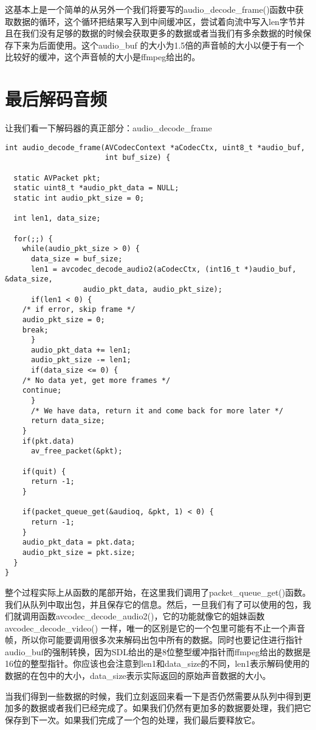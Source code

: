 这基本上是一个简单的从另外一个我们将要写的audio_decode_frame()函数中获取数据的循环，这个循环把结果写入到中间缓冲区，尝试着向流中写入len字节并且在我们没有足够的数据的时候会获取更多的数据或者当我们有多余数据的时候保存下来为后面使用。这个audio_buf 的大小为1.5倍的声音帧的大小以便于有一个比较好的缓冲，这个声音帧的大小是ffmpeg给出的。

\section{最后解码音频}
让我们看一下解码器的真正部分：audio_decode_frame
\begin{lstlisting}
int audio_decode_frame(AVCodecContext *aCodecCtx, uint8_t *audio_buf,
                       int buf_size) {

  static AVPacket pkt;
  static uint8_t *audio_pkt_data = NULL;
  static int audio_pkt_size = 0;

  int len1, data_size;

  for(;;) {
    while(audio_pkt_size > 0) {
      data_size = buf_size;
      len1 = avcodec_decode_audio2(aCodecCtx, (int16_t *)audio_buf, &data_size,
                  audio_pkt_data, audio_pkt_size);
      if(len1 < 0) {
    /* if error, skip frame */
    audio_pkt_size = 0;
    break;
      }
      audio_pkt_data += len1;
      audio_pkt_size -= len1;
      if(data_size <= 0) {
    /* No data yet, get more frames */
    continue;
      }
      /* We have data, return it and come back for more later */
      return data_size;
    }
    if(pkt.data)
      av_free_packet(&pkt);

    if(quit) {
      return -1;
    }

    if(packet_queue_get(&audioq, &pkt, 1) < 0) {
      return -1;
    }
    audio_pkt_data = pkt.data;
    audio_pkt_size = pkt.size;
  }
}
\end{lstlisting}

整个过程实际上从函数的尾部开始，在这里我们调用了packet_queue_get()函数。我们从队列中取出包，并且保存它的信息。然后，一旦我们有了可以使用的包，我们就调用函数avcodec_decode_audio2()，它的功能就像它的姐妹函数avcodec_decode_video() 一样，唯一的区别是它的一个包里可能有不止一个声音帧，所以你可能要调用很多次来解码出包中所有的数据。同时也要记住进行指针audio_buf的强制转换，因为SDL给出的是8位整型缓冲指针而ffmpeg给出的数据是16位的整型指针。你应该也会注意到len1和data_size的不同，len1表示解码使用的数据的在包中的大小，data_size表示实际返回的原始声音数据的大小。

当我们得到一些数据的时候，我们立刻返回来看一下是否仍然需要从队列中得到更加多的数据或者我们已经完成了。如果我们仍然有更加多的数据要处理，我们把它保存到下一次。如果我们完成了一个包的处理，我们最后要释放它。

